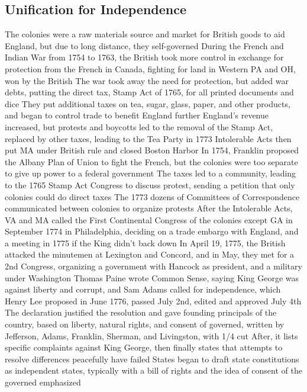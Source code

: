 \documentclass[11 pt, twoside]{article}
\newenvironment{outline*}
{
	\begin{outline}[enumerate]
	}
	{\end{outline}
}
\begin{document}
\subsection{Unification for Independence}
\begin{outline*}
\1 The colonies were a raw materials source and market for British goods to aid England, but due to long distance, they self-governed
\2 During the French and Indian War from 1754 to 1763, the British took more control in exchange for protection from the French in Canada, fighting for land in Western PA and OH, won by the British
\2 The war took away the need for protection, but added war debts, putting the direct tax, Stamp Act of 1765, for all printed documents and dice
\2 They put additional taxes on tea, sugar, glass, paper, and other products, and began to control trade to benefit England further
\1 England’s revenue increased, but protests and boycotts led to the removal of the Stamp Act, replaced by other taxes, leading to the Tea Party in 1773
\2 Intolerable Acts then put MA under British rule and closed Boston Harbor
\1 In 1754, Franklin proposed the Albany Plan of Union to fight the French, but the colonies were too separate to give up power to a federal government
\2 The taxes led to a community, leading to the 1765 Stamp Act Congress to discuss protest, sending a petition that only colonies could do direct taxes
\2 The 1773 dozens of Committees of Correspondence communicated between colonies to organize protests
\1 After the Intolerable Acts, VA and MA called the First Continental Congress of the colonies except GA in September 1774 in Philadelphia, deciding on a trade embargo with England, and a meeting in 1775 if the King didn’t back down
\2 In April 19, 1775, the British attacked the minutemen at Lexington and Concord, and in May, they met for a 2nd Congress, organizing a government with Hancock as president, and a military under Washington
\1 Thomas Paine wrote Common Sense, saying King George was against liberty and corrupt, and Sam Adams called for independence, which Henry Lee proposed in June 1776, passed July 2nd, edited and approved July 4th
\2 The declaration justified the resolution and gave founding principals of the country, based on liberty, natural rights, and consent of governed, written by Jefferson, Adams, Franklin, Sherman, and Livingston, with 1/4 cut
\2 After, it lists specific complaints against King George, then finally states that attempts to resolve differences peacefully have failed
\1 States began to draft state constitutions as independent states, typically with a bill of rights and the idea of consent of the governed emphasized
\end{outline*}
\end{document}
